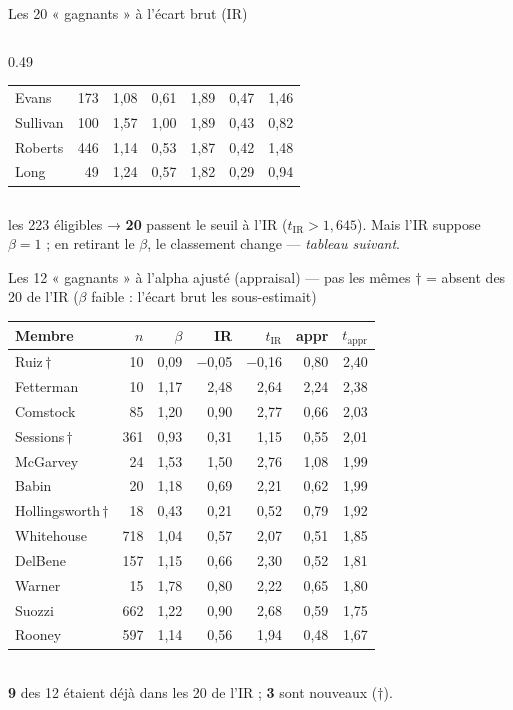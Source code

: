 \documentclass[11pt,aspectratio=169]{beamer}
\newcommand{\defl}[1]{{\scriptsize\color{black!55}#1}}
\begin{document}
\begin{frame}{Les 20 « gagnants » à l'écart brut (IR)}
{\begin{columns}[T]
\begin{column}{0.49\textwidth}
\begin{tabular}{@{}l r r r r r r@{}}
        Evans & 173 & 1,08 & 0,61 & 1,89 & 0,47 & 1,46\\
        Sullivan & 100 & 1,57 & 1,00 & 1,89 & 0,43 & 0,82\\
        Roberts & 446 & 1,14 & 0,53 & 1,87 & 0,42 & 1,48\\
        Long & 49 & 1,24 & 0,57 & 1,82 & 0,29 & 0,94\\
        \bottomrule
      \end{tabular}
    \end{column}
  \end{columns}}\par\medskip
  \defl{les 223 éligibles → \textbf{20} passent le seuil à l'IR ($t_{\mathrm{IR}}>1{,}645$). Mais l'IR suppose $\beta=1$ ; en retirant le $\beta$, le classement change — \emph{tableau suivant}.}
\end{frame}

\begin{frame}{Les 12 « gagnants » à l'alpha ajusté (appraisal) — pas les mêmes}
  \centering
  {\scriptsize $\dagger$ = absent des 20 de l'IR ($\beta$ faible : l'écart brut les sous-estimait)}\\[1mm]
  {\footnotesize
  \begin{tabular}{@{}l r r r r r r@{}}
    \toprule
    Membre & $n$ & $\beta$ & IR & $t_{\mathrm{IR}}$ & appr & $t_{\mathrm{appr}}$\\\midrule
    Ruiz\,$\dagger$ & 10 & 0,09 & $-$0,05 & $-$0,16 & 0,80 & 2,40\\
    Fetterman & 10 & 1,17 & 2,48 & 2,64 & 2,24 & 2,38\\
    Comstock & 85 & 1,20 & 0,90 & 2,77 & 0,66 & 2,03\\
    Sessions\,$\dagger$ & 361 & 0,93 & 0,31 & 1,15 & 0,55 & 2,01\\
    McGarvey & 24 & 1,53 & 1,50 & 2,76 & 1,08 & 1,99\\
    Babin & 20 & 1,18 & 0,69 & 2,21 & 0,62 & 1,99\\
    Hollingsworth\,$\dagger$ & 18 & 0,43 & 0,21 & 0,52 & 0,79 & 1,92\\
    Whitehouse & 718 & 1,04 & 0,57 & 2,07 & 0,51 & 1,85\\
    DelBene & 157 & 1,15 & 0,66 & 2,30 & 0,52 & 1,81\\
    Warner & 15 & 1,78 & 0,80 & 2,22 & 0,65 & 1,80\\
    Suozzi & 662 & 1,22 & 0,90 & 2,68 & 0,59 & 1,75\\
    Rooney & 597 & 1,14 & 0,56 & 1,94 & 0,48 & 1,67\\
    \bottomrule
  \end{tabular}}\\[2mm]
  \defl{\textbf{9} des 12 étaient déjà dans les 20 de l'IR ; \textbf{3} sont nouveaux ($\dagger$).}
\end{frame}
\end{document}
